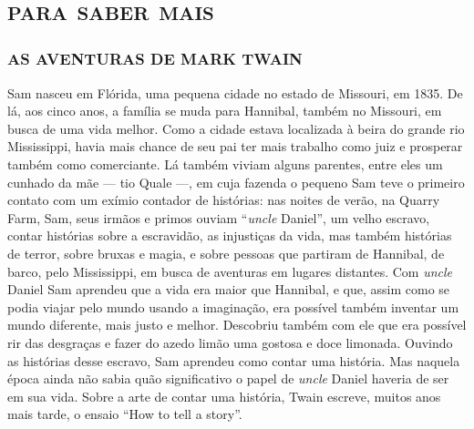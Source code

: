 \part{\textsc{para saber mais}}


\section{AS AVENTURAS DE MARK TWAIN}

Sam nasceu em Flórida, uma pequena cidade no estado de Missouri, em
1835. De lá, aos cinco anos, a família se muda para Hannibal, também no
Missouri, em busca de uma vida melhor. Como a cidade estava
localizada à beira do grande rio Mississippi, havia mais chance de seu pai ter
mais trabalho como juiz e prosperar também como comerciante.
Lá também viviam alguns parentes, entre eles um cunhado da mãe --- 
tio Quale ---, em cuja fazenda o pequeno Sam teve o primeiro contato com
um exímio contador de histórias: nas noites de verão, na
Quarry Farm, Sam, seus irmãos e primos ouviam ``\textit{uncle}
Daniel'', um velho escravo, contar histórias sobre a
escravidão, as injustiças da vida, mas também histórias de terror, sobre
bruxas e magia, e sobre pessoas que partiram de Hannibal, de barco, pelo
Mississippi, em busca de aventuras em lugares distantes. Com \textit{uncle} Daniel
Sam aprendeu que a vida era maior que Hannibal, e que, assim como se podia
viajar pelo mundo usando a imaginação, era possível também inventar um mundo
diferente, mais justo e melhor. Descobriu também com ele que era
possível rir das desgraças e fazer do azedo limão uma gostosa e doce
limonada. Ouvindo as histórias desse escravo, Sam aprendeu como
contar uma história. Mas naquela época ainda não sabia quão
significativo o papel de \textit{uncle} Daniel haveria de ser em sua vida. Sobre a
arte de contar uma história, Twain escreve, muitos anos mais tarde, o
ensaio ``How to tell a story''.

